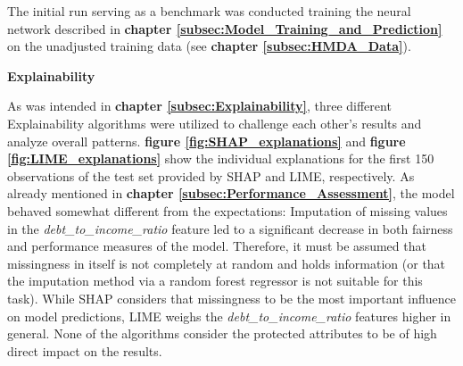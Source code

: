 The initial run serving as a benchmark was conducted training the neural network described in \textbf{chapter \ref{subsec:Model_Training_and_Prediction}} on the unadjusted training data (see \textbf{chapter \ref{subsec:HMDA_Data}}).

\textbf{Explainability}

As was intended in \textbf{chapter \ref{subsec:Explainability}}, three different Explainability algorithms were utilized to challenge each other's results and analyze overall patterns. \textbf{figure \ref{fig:SHAP_explanations}} and \textbf{figure \ref{fig:LIME_explanations}} show the individual explanations for the first 150 observations of the test set provided by SHAP and LIME, respectively. 
As already mentioned in \textbf{chapter \ref{subsec:Performance_Assessment}}, the model behaved somewhat different from the expectations: Imputation of missing values in the \textit{debt\_to\_income\_ratio} feature led to a significant decrease in both fairness and performance measures of the model.
Therefore, it must be assumed that missingness in itself is not completely at random and holds information (or that the imputation method via a random forest regressor is not suitable for this task).
While SHAP considers that missingness to be the most important influence on model predictions, LIME weighs the \textit{debt\_to\_income\_ratio} features higher in general.
None of the algorithms consider the protected attributes to be of high direct impact on the results.

